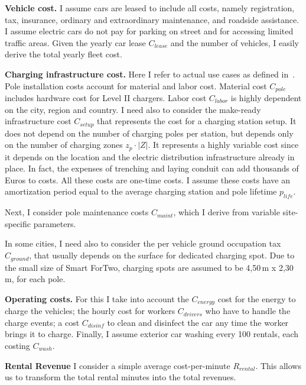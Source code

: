 \textbf{Vehicle cost.} I assume cars are leased to include all costs, namely registration, tax, insurance, ordinary and extraordinary maintenance, and roadside assistance. I assume electric cars do not pay for parking on street and for accessing limited traffic areas. Given the yearly car lease $C_{lease}$ and the number of vehicles, I easily derive the total yearly fleet cost.
 

\textbf{Charging infrastructure cost.} Here I refer to actual use cases as defined in~\cite{evInfrastructureCosts}. Pole installation costs account for material and labor cost. Material cost $C_{pole}$ includes hardware cost for Level II chargers.
Labor cost $C_{labor}$ is highly dependent on the city, region and country.
I need also to consider the make-ready infrastructure cost $C_{setup}$ that represents the cost for a charging station setup. It does not depend on the number of charging poles per station, but depends only on the number of charging zones $z_p\cdot|Z|$. It represents a highly variable cost since it depends on the location and the electric distribution infrastructure already in place. In fact, the expenses of trenching and laying conduit can add thousands of Euros to costs. %
All these costs are one-time costs. I assume these costs have an amortization period equal to the average charging station and pole lifetime $p_{life}$.

Next, I consider pole maintenance costs $C_{maint}$, which I derive from variable site-specific parameters.

In some cities, I need also to consider the per vehicle ground occupation tax $C_{ground}$, that usually depends on the surface for dedicated charging spot.
Due to the small size of Smart ForTwo, charging spots are assumed to be 4,50\,m x 2,30\,m, for each pole.


\textbf{Operating costs.} For this I take into account the $C_{energy}$ cost for the energy to charge the vehicles; the hourly cost for workers $C_{drivers}$ who have to handle the charge events; a cost $C_{disinf}$ to clean and disinfect the car any time the worker brings it to charge. Finally, I assume exterior car washing every 100 rentals, each costing $C_{wash}$.

\textbf{Rental Revenue} I consider a simple average cost-per-minute $R_{rental}$. This allows us to transform the total rental minutes into the total revenues.

